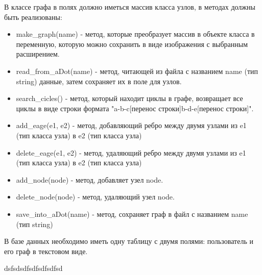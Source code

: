 В классе графа в полях должно иметься массив класса узлов, в методах должны быть реализованы:
\begin{itemize}
\item make_graph(name) - метод, которые преобразует массив в объекте класса в переменную, которую можно сохранить в виде изображения с выбранным расширением.
\item read_from_aDot(name) - метод, читающей из файла с названием name (тип string) данные, затем сохраняет их в поле для узлов.
\item search_cicles() - метод, который находит циклы в графе, возвращает все циклы в виде строки формата "a-b-c[перенос строки]b-d-e[перенос строки]".
\item add_eage(e1, e2) - метод, добавляющий ребро между двумя узлами из e1 (тип класса узла) в e2 (тип класса узла)
\item delete_eage(e1, e2) - метод, удаляющий ребро между двумя узлами из e1 (тип класса узла) в e2 (тип класса узла)
\item add_node(node) - метод, добавляет узел node.
\item delete_node(node) - метод, удаляющий узел node.
\item save_into_aDot(name) - метод, сохраняет граф в файл с названием name (тип string)
\end{itemize}

В базе данных необходимо иметь одну таблицу с двумя полями: пользователь и его граф в текстовом виде.

\begin{task}
dsfsdsdfsdfsdfsdfsd
\end{task}


\noteattributes{} 